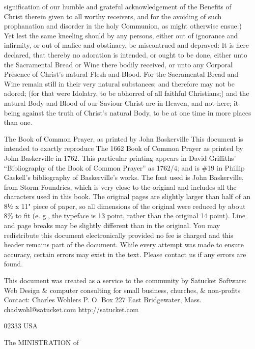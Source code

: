 signification of our humble and grateful acknowledgement of the Benefits of Christ therein given to all worthy receivers, and for the avoiding of such prophanation and disorder in the holy Communion, as might otherwise ensue:) Yet lest the same kneeling should by any persons, either out of ignorance and infirmity, or out of malice and obstinacy, be miscontrued and depraved: It is here declared, that thereby no adoration is intended, or ought to be done, either unto the Sacramental Bread or Wine there bodily received, or unto any Corporal Presence of Christ’s natural Flesh and Blood. For the Sacramental Bread and Wine remain still in their very natural substances; and therefore may not be adored; (for that were Idolatry, to be abhorred of all faithful Christians;) and the natural Body and Blood of our Saviour Christ are in Heaven, and not here; it being against the truth of Christ’s natural Body, to be at one time in more places than one.


The Book of Common Prayer, as printed by John Baskerville This document is intended to exactly reproduce The 1662 Book of Common Prayer as printed by John Baskerville in 1762. This particular printing appears in David Griffiths' “Bibliography of the Book of Common Prayer” as 1762/4; and is \#19 in Phillip Gaskell's bibliography of Baskerville's works. The font used is John Baskerville, from Storm Foundries, which is very close to the original and includes all the characters used in this book. The original pages are slightly larger than half of an 8½ x 11" piece of paper, so all dimensions of the original were reduced by about 8\% to fit (e. g., the typeface is 13 point, rather than the original 14 point). Line and page breaks may be slightly different than in the original. You may redistribute this document electronically provided no fee is charged and this header remains part of the document. While every attempt was made to ensure accuracy, certain errors may exist in the text. Please contact us if any errors are found.

This document was created as a service to the community by Satucket Software: Web Design \& computer consulting for small business, churches, \& non-profits Contact: Charles Wohlers P. O. Box 227 East Bridgewater, Mass. chadwohl@satucket.com http://satucket.com

02333 USA

The MINISTRATION of

